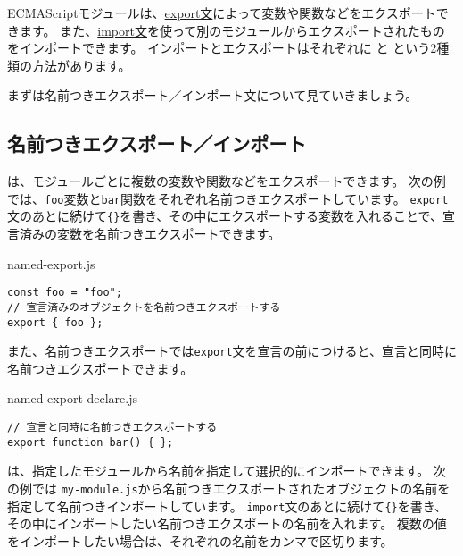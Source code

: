 ECMAScriptモジュールは、\href{https://developer.mozilla.org/ja/docs/Web/JavaScript/Reference/Statements/export}{export文}によって変数や関数などをエクスポートできます。
また、\href{https://developer.mozilla.org/ja/docs/Web/JavaScript/Reference/Statements/import}{import文}を使って別のモジュールからエクスポートされたものをインポートできます。
インポートとエクスポートはそれぞれに \textbf{}と
\textbf{}という2種類の方法があります。

まずは名前つきエクスポート／インポート文について見ていきましょう。

\hypertarget{named-export-import}{%
\subsection{名前つきエクスポート／インポート}\label{named-export-import}}

\textbf{}は、モジュールごとに複数の変数や関数などをエクスポートできます。
次の例では、\texttt{foo}変数と\texttt{bar}関数をそれぞれ名前つきエクスポートしています。
\texttt{export}文のあとに続けて\texttt{\{\}}を書き、その中にエクスポートする変数を入れることで、宣言済みの変数を名前つきエクスポートできます。

\begin{listtitle}
named-export.js
\end{listtitle}
\begin{lstlisting}
const foo = "foo";
// 宣言済みのオブジェクトを名前つきエクスポートする
export { foo };
\end{lstlisting}
\listend

また、名前つきエクスポートでは\texttt{export}文を宣言の前につけると、宣言と同時に名前つきエクスポートできます。

\begin{listtitle}
named-export-declare.js
\end{listtitle}
\begin{lstlisting}
// 宣言と同時に名前つきエクスポートする
export function bar() { };
\end{lstlisting}
\listend

\textbf{}は、指定したモジュールから名前を指定して選択的にインポートできます。
次の例では
\texttt{my-module.js}から名前つきエクスポートされたオブジェクトの名前を指定して名前つきインポートしています。
\texttt{import}文のあとに続けて\texttt{\{\}}を書き、その中にインポートしたい名前つきエクスポートの名前を入れます。
複数の値をインポートしたい場合は、それぞれの名前をカンマで区切ります。

